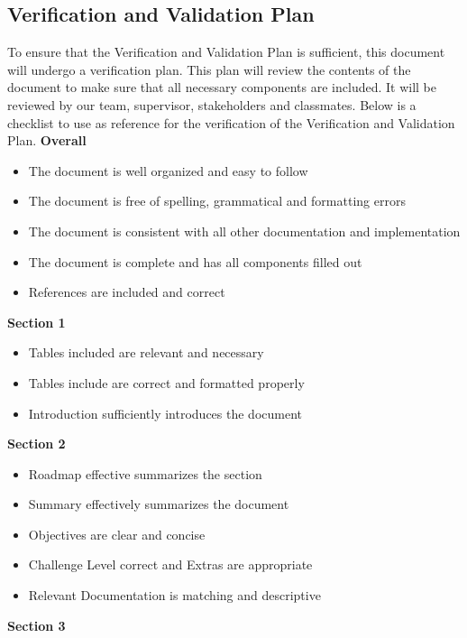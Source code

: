 \documentclass[12pt, titlepage]{article}
\begin{document}
\subsection{Verification and Validation Plan}

To ensure that the Verification and Validation Plan is sufficient, this document will undergo a verification plan.
This plan will review the contents of the document to make sure that all necessary components are included.
It will be reviewed by our team, supervisor, stakeholders and classmates.
Below is a checklist to use as reference for the verification of the Verification and Validation Plan.
\bigskip
\newline
\textbf{Overall}
\begin{itemize}
  \item The document is well organized and easy to follow
  \item The document is free of spelling, grammatical and formatting errors
  \item The document is consistent with all other documentation and implementation
  \item The document is complete and has all components filled out
  \item References are included and correct
\end{itemize}
\noindent
\textbf{Section 1}
\begin{itemize}
  \item Tables included are relevant and necessary
  \item Tables include are correct and formatted properly
  \item Introduction sufficiently introduces the document
\end{itemize}
\noindent
\textbf{Section 2}
\begin{itemize}
  \item Roadmap effective summarizes the section
  \item Summary effectively summarizes the document
  \item Objectives are clear and concise
  \item Challenge Level correct and Extras are appropriate
  \item Relevant Documentation is matching and descriptive
\end{itemize}
\noindent
\textbf{Section 3}
\end{document}

